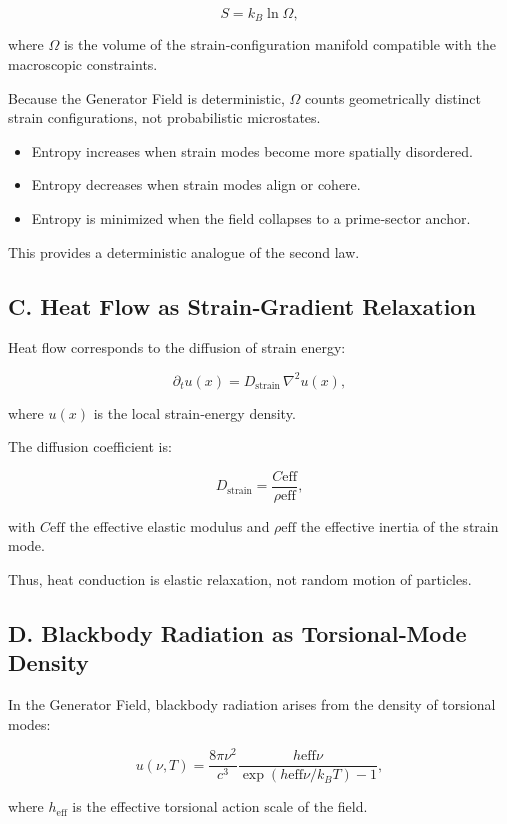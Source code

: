 \documentclass[reprint,amsmath,amssymb,aps,prl,floatfix]{revtex4-2}
\begin{document}
\begin{itemize}
\[
S
=
k_B \ln \Omega,
\]

where \(\Omega\) is the volume of the strain‑configuration manifold compatible with the macroscopic constraints.

Because the Generator Field is deterministic, \(\Omega\) counts geometrically distinct strain configurations, not probabilistic microstates.

\begin{itemize}
\item Entropy increases when strain modes become more spatially disordered.  
\item Entropy decreases when strain modes align or cohere.  
\item Entropy is minimized when the field collapses to a prime‑sector anchor.
\end{itemize}

This provides a deterministic analogue of the second law.


\subsection{C. Heat Flow as Strain‑Gradient Relaxation}

Heat flow corresponds to the diffusion of strain energy:

\[
\partial_t u(x)
=
D_{\mathrm{strain}}\,\nabla^2 u(x),
\]

where \(u(x)\) is the local strain‑energy density.

The diffusion coefficient is:

\[
D_{\mathrm{strain}}
=
\frac{C{\mathrm{eff}}}{\rho{\mathrm{eff}}},
\]

with \(C{\mathrm{eff}}\) the effective elastic modulus and \(\rho{\mathrm{eff}}\) the effective inertia of the strain mode.

Thus, heat conduction is elastic relaxation, not random motion of particles.

\subsection{D. Blackbody Radiation as Torsional‑Mode Density}

In the Generator Field, blackbody radiation arises from the density of torsional modes:

\[
u(\nu,T)
=
\frac{8\pi\nu^2}{c^3}
\frac{h{\mathrm{eff}}\nu}{\exp(h{\mathrm{eff}}\nu/k_B T)-1},
\]

where \(h_{\mathrm{eff}}\) is the effective torsional action scale of the field.


\end{itemize}
\end{document}
